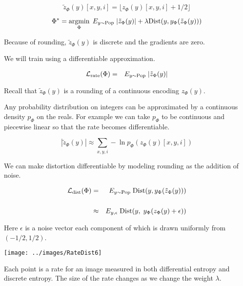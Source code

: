 {\vfill
$$\tilde{z}_\Phi(y)[x,y,i] = \lfloor z_\Phi(y)[x,y,i] + 1/2 \rfloor$$


$$\Phi^* = \operatorname*{argmin}_\Phi \;E_{y \sim \mathrm{Pop}}\;|\tilde{z}_\Phi(y)| + \lambda \mathrm{Dist}(y,y_\Phi(\tilde{z}_\Phi(y)))$$

\vfill
Because of rounding, $\tilde{z}_\Phi(y)$ is discrete and the gradients are zero.

\vfill
We will train using a differentiable approximation.


\begin{eqnarray*}
{\cal L}_{\mathrm{rate}}(\Phi) & = & E_{y \sim \mathrm{Pop}}\;|\tilde{z}_\Phi(y)|
\end{eqnarray*}

\vfill
Recall that {\color{red} $\tilde{z}_\Phi(y)$} is a rounding of a continuous encoding {\color{red} $z_\Phi(y)$}.

\vfill
Any probability distribution on integers can be approximated by a continuous density $p_\Phi$ on the reals.  For example we can take $p_\Phi$ to be continuous and
piecewise linear so that the rate becomes differentiable.

\vfill
{\color{red} $$|\tilde{z}_\Phi(y)| \approx \sum_{x,y,i} -\ln p_\Phi(z_\Phi(y)[x,y,i])$$}


We can make distortion differentiable by modeling rounding as the addition of noise.

\begin{eqnarray*}
{\cal L}_{\mathrm{dist}}(\Phi) & = & E_{y \sim \mathrm{Pop}} \;\mathrm{Dist}(y,y_\Phi(\tilde{z}_\Phi(y))) \\
\\
& \approx & E_{y,\epsilon} \;\mathrm{Dist}(y,\;y_\Phi(z_\Phi(y) + \epsilon))
\end{eqnarray*}

\vfill
Here $\epsilon$ is a noise vector each component of which is drawn uniformly from $(-1/2,1/2)$.


\bigskip
\centerline{\texttt{[image: ../images/RateDist6]}}

Each point is a rate for an image measured in both differential entropy and discrete entropy.  The size of the rate changes as we change the weight $\lambda$.

}
